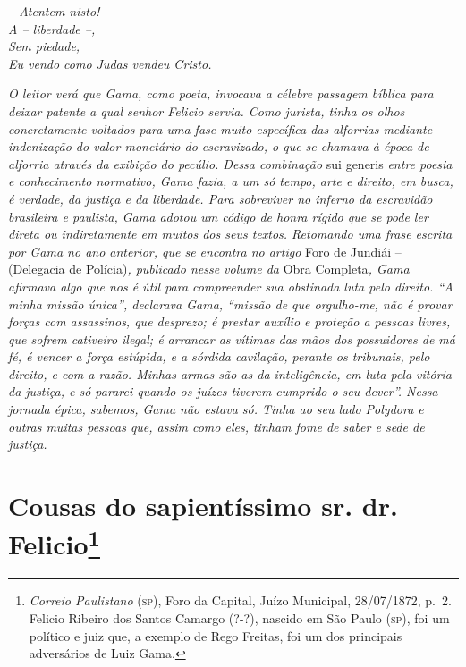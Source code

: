 \emph{-- Atentem nisto!\\
A -- liberdade --,\\
Sem piedade,\\
Eu vendo como Judas vendeu Cristo.}

\emph{O leitor verá que Gama, como poeta, invocava a célebre passagem
bíblica para deixar patente a qual senhor Felicio servia. Como jurista,
tinha os olhos concretamente voltados para uma fase muito específica das
alforrias mediante indenização do valor monetário do escravizado, o que
se chamava à época de alforria através da exibição do pecúlio. Dessa
combinação} sui generis \emph{entre poesia e conhecimento normativo,
Gama fazia, a um só tempo, arte e direito, em busca, é verdade, da
justiça e da liberdade. Para sobreviver no inferno da escravidão
brasileira e paulista, Gama adotou um código de honra rígido que se pode
ler direta ou indiretamente em muitos dos seus textos. Retomando uma
frase escrita por Gama no ano anterior, que se encontra no artigo} Foro
de Jundiái -- (Delegacia de Polícia)\emph{, publicado nesse volume da}
Obra Completa\emph{, Gama afirmava algo que nos é útil para compreender
sua obstinada luta pelo direito. ``A minha missão única'', declarava Gama,
``missão de que orgulho-me, não é provar forças com assassinos, que
desprezo; é prestar auxílio e proteção a pessoas livres, que sofrem
cativeiro ilegal; é arrancar as vítimas das mãos dos possuidores de má
fé, é vencer a força estúpida, e a sórdida cavilação, perante os
tribunais, pelo direito, e com a razão. Minhas armas são as da
inteligência, em luta pela vitória da justiça, e só pararei quando os
juízes tiverem cumprido o seu dever''. Nessa jornada épica, sabemos, Gama
não estava só. Tinha ao seu lado Polydora e outras muitas pessoas que,
assim como eles, tinham fome de saber e sede de justiça.}

\chapter{Cousas do sapientíssimo sr. dr. Felicio\footnote{
\emph{Correio Paulistano} (\textsc{sp}), Foro da Capital, Juízo
  Municipal, 28/07/1872, p.~2. Felicio Ribeiro dos Santos Camargo (?-?),
  nascido em São Paulo (\textsc{sp}), foi um político e juiz que, a exemplo de
  Rego Freitas, foi um dos principais adversários de Luiz Gama.}} %

